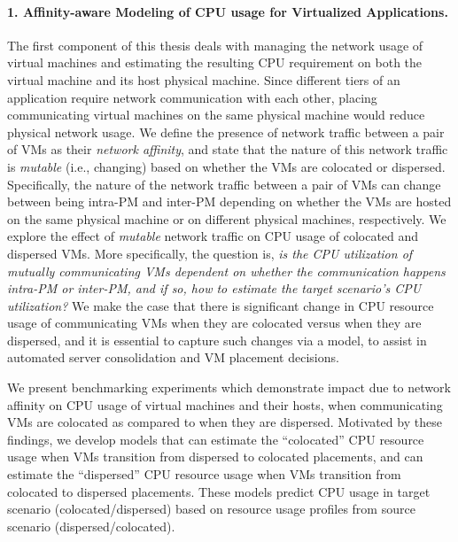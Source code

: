 \paragraph{1. Affinity-aware Modeling of CPU usage for Virtualized Applications.}
The first component of this thesis deals with managing the network 
usage of virtual machines and estimating the resulting CPU 
requirement on both the virtual machine 
and its host physical machine.
Since different tiers of an application require network
communication with each other, placing communicating virtual
machines on the same physical machine 
would reduce physical network 
usage. We define the presence of network traffic between a pair
of VMs as their \textit{network affinity}, 
and state that the
nature of this network traffic is \textit{mutable} 
(i.e., changing) based on
whether the VMs are colocated or 
dispersed. Specifically, the
nature of the network traffic between a pair of VMs
can change between being
intra-PM and inter-PM 
depending on whether the VMs are hosted
on the same physical machine or on different physical machines, respectively.
We explore the effect of \textit{mutable}
network traffic on CPU usage of colocated and dispersed VMs. More
specifically, the question is, \textit{is the CPU utilization of mutually
communicating VMs dependent on whether the communication happens
intra-PM or inter-PM, and if so, 
how to estimate the target scenario's CPU utilization?}
We make the case that there is significant change in CPU resource
usage of communicating VMs when they are colocated versus when they are 
dispersed, and it is
essential to capture such changes via a model, to assist in
automated server consolidation 
and VM placement decisions.

We present benchmarking experiments
which demonstrate impact due to network affinity
on CPU usage of virtual machines and their hosts, when communicating
VMs are colocated as compared to
when they are dispersed. Motivated by these findings, we develop models
that can estimate the ``colocated'' CPU resource usage when VMs transition
from dispersed to colocated placements, and can estimate the ``dispersed''
CPU resource usage when VMs transition from colocated to dispersed
placements. These models predict CPU usage in target 
scenario (colocated/dispersed) based on resource usage profiles 
from source scenario (dispersed/colocated).

